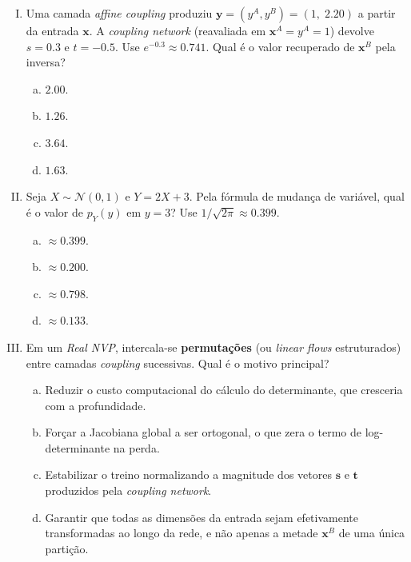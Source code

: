 \documentclass{dlproblemset}
\begin{document}
\begin{enumerate}[I)]
    \item Uma camada \textit{affine coupling} produziu $\mathbf{y} = (y^A, y^B) = (1,\; 2.20)$ a partir da entrada $\mathbf{x}$. A \textit{coupling network} (reavaliada em $\mathbf{x}^A = y^A = 1$) devolve $s = 0.3$ e $t = -0.5$. Use $e^{-0.3} \approx 0.741$. Qual é o valor recuperado de $\mathbf{x}^B$ pela inversa?
    \begin{enumerate}[(a)]
        \item $2.00$.
        \item $1.26$.
        \item $3.64$.
        \item $1.63$.
    \end{enumerate}

    \item {} Seja $X \sim \mathcal{N}(0,1)$ e $Y = 2X + 3$. Pela fórmula de mudança de variável, qual é o valor de $p_Y(y)$ em $y = 3$? Use $1/\sqrt{2\pi} \approx 0.399$.
    \begin{enumerate}[(a)]
        \item $\approx 0.399$.
        \item $\approx 0.200$.
        \item $\approx 0.798$.
        \item $\approx 0.133$.
    \end{enumerate}

    \item Em um \textit{Real NVP}, intercala-se \textbf{permutações} (ou \textit{linear flows} estruturados) entre camadas \textit{coupling} sucessivas. Qual é o motivo principal?
    \begin{enumerate}[(a)]
        \item Reduzir o custo computacional do cálculo do determinante, que cresceria com a profundidade.
        \item Forçar a Jacobiana global a ser ortogonal, o que zera o termo de log-determinante na perda.
        \item Estabilizar o treino normalizando a magnitude dos vetores $\mathbf{s}$ e $\mathbf{t}$ produzidos pela \textit{coupling network}.
        \item Garantir que todas as dimensões da entrada sejam efetivamente transformadas ao longo da rede, e não apenas a metade $\mathbf{x}^B$ de uma única partição.
    \end{enumerate}


\end{enumerate}
\end{document}
